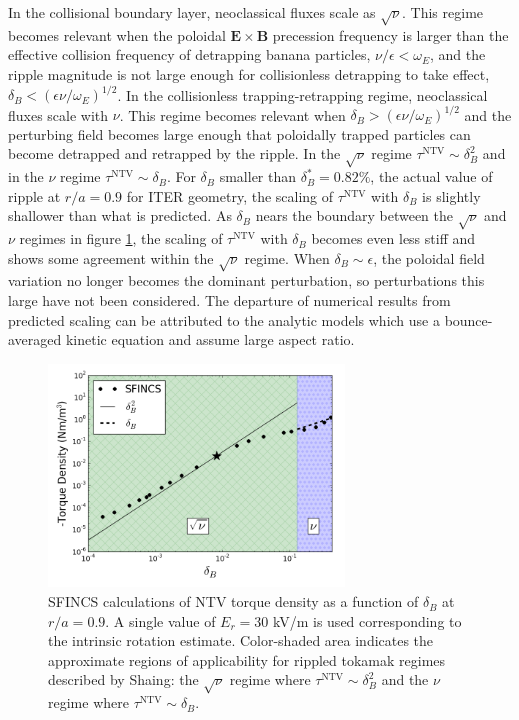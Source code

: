 \documentclass[aip, pop, preprint]{revtex4-1}
\numberwithin{figure}{section}
\numberwithin{equation}{section}
\begin{document}
In the collisional boundary layer, neoclassical fluxes scale as $\sqrt{\nu}$.\cite{Shaing2008} This regime becomes relevant when the poloidal $\bm{E} \times \bm{B}$ precession frequency is larger than the effective collision frequency of detrapping banana particles, $\nu/\epsilon < \omega_E$, and the ripple magnitude is not large enough for collisionless detrapping to take effect, $\delta_B < \left(  \epsilon \nu/\omega_E \right)^{1/2}$. 
In the collisionless trapping-retrapping regime, neoclassical fluxes scale with $\nu$.\cite{Shaing2009} This regime becomes relevant when $\delta_B > \left(  \epsilon \nu/\omega_E \right)^{1/2}$ and the perturbing field becomes large enough that poloidally trapped particles can become detrapped and retrapped by the ripple. In the $\sqrt{\nu}$ regime $\tau^{\text{NTV}} \sim \delta_B^2$ and in the $\nu$ regime $\tau^{\text{NTV}} \sim \delta_B$. For $\delta_B$ smaller than $\delta_B^* = 0.82\%$, the actual value of ripple at $r/a=0.9$ for ITER geometry, the scaling of $\tau^{\text{NTV}}$ with $\delta_B$ is slightly shallower than what is predicted. 
As $\delta_B$ nears the boundary between the $\sqrt{\nu}$ and $\nu$ regimes in figure \ref{fig:scalescan}, the scaling of $\tau^{\text{NTV}}$ with $\delta_B$ becomes even less stiff and shows some agreement within the $\sqrt{\nu}$ regime. When $\delta_B \sim \epsilon$, the poloidal field variation no longer becomes the dominant perturbation, so perturbations this large have not been considered. The departure of numerical results from predicted scaling can be attributed to the analytic models which use a bounce-averaged kinetic equation and assume large aspect ratio. 

\begin{figure}[h!]
\centering
\includegraphics[width=0.7\textwidth]
{scalescan.png}
\caption{\label{fig:scalescan} SFINCS calculations of NTV torque density as a function of $\delta_B$ at $r/a = 0.9$. A single value of $E_r = 30$ kV/m is used corresponding to the intrinsic rotation estimate. Color-shaded area indicates the approximate regions of applicability for rippled tokamak regimes described by Shaing: the $\sqrt{\nu}$ regime where $\tau^{\text{NTV}} \sim \delta_B^2$\cite{Shaing2008} and the $\nu$ regime where $\tau^{\text{NTV}} \sim \delta_B$.\cite{Shaing2009} }
\end{figure} 
\end{document}

